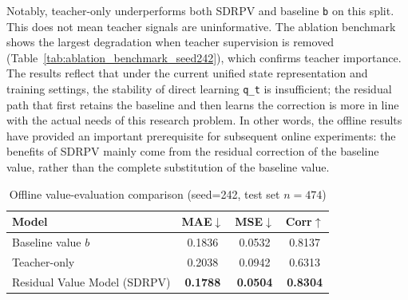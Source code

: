 Notably, teacher-only underperforms both SDRPV and baseline \texttt{b} on this split. This does not mean teacher signals are uninformative. The ablation benchmark shows the largest degradation when teacher supervision is removed (Table~\ref{tab:ablation_benchmark_seed242}), which confirms teacher importance. The results reflect that under the current unified state representation and training settings, the stability of direct learning \texttt{q_t} is insufficient; the residual path that first retains the baseline and then learns the correction is more in line with the actual needs of this research problem. In other words, the offline results have provided an important prerequisite for subsequent online experiments: the benefits of SDRPV mainly come from the residual correction of the baseline value, rather than the complete substitution of the baseline value.


\begin{table}[htbp]
\centering
\caption{Offline value-evaluation comparison (seed=242, test set $n=474$)}
\label{tab:offline_metrics_seed242}
\begin{tabular}{lccc}
\toprule
Model & MAE$\downarrow$ & MSE$\downarrow$ & Corr$\uparrow$ \\
\midrule
Baseline value $b$ & 0.1836 & 0.0532 & 0.8137 \\
Teacher-only & 0.2038 & 0.0942 & 0.6313 \\
Residual Value Model (SDRPV) & \textbf{0.1788} & \textbf{0.0504} & \textbf{0.8304} \\
\bottomrule
\end{tabular}
\end{table}


